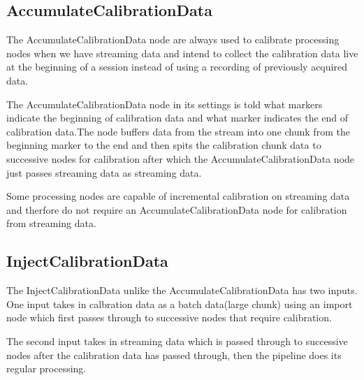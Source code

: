 \documentclass[16pt]{book}
\begin{document}
\subsection{AccumulateCalibrationData}
\par\noindent The AccumulateCalibrationData node are always used to calibrate processing nodes when we have streaming data and intend to collect the calibration data live at the beginning
of a session instead of using a recording of previously acquired data.
\par\noindent The AccumulateCalibrationData node in its settings is told what markers indicate the beginning of calibration data and what marker indicates the end of calibration data.The node buffers data
from the stream into one chunk from the beginning marker to the end and then spits the calibration chunk data to successive nodes for calibration after which the AccumulateCalibrationData node just passes streaming 
data as streaming data.
\par\noindent Some processing nodes are capable of incremental calibration on streaming data and therfore do not require an AccumulateCalibrationData node for calibration 
from streaming data.
\subsection{InjectCalibrationData}
\par\noindent The InjectCalibrationData unlike the AccumulateCalibrationData has two inputs. One input takes in calbration data as a batch data(large chunk) using an import node 
which first passes through to successive nodes that require calibration.
\par\noindent The second input takes in streaming data which is passed through to successive nodes after the calibration data has passed through, then the pipeline does its regular
processing.
\end{document}
